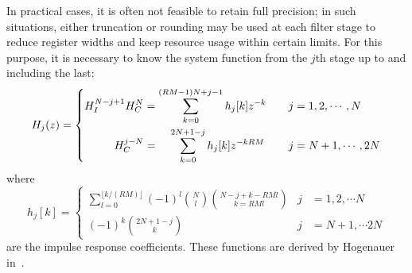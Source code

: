 In practical cases, it is often not feasible to retain full precision; in such
situations, either truncation or rounding may  be used at each filter stage to
reduce register widths and keep resource usage within certain limits. For this
purpose, it is necessary  to know the system function from  the $j$th stage up
to and including the last:
\begin{equation}
    \label{eq:cic:truncation_rounding:system_function}
    H_j(z) = \left\lbrace
        \begin{aligned}
            H_I^{N-j+1}H_C^N                        &
            = \sum_{k=0}^{(RM-1)N+j-1} h_j[k]z^{-k} &
            \quad j                                 &
            = 1, 2, \cdots, N                       \\
            H_C^{j-N}                                          &
            = \hspace{1.1em}\sum_{k=0}^{2N+1-j} h_j[k]z^{-kRM} &
            \quad j                                            &
            = N+1, \cdots, 2N
        \end{aligned}
    \right.
\end{equation}
where
\begin{equation}
    \label{eq:cic:truncation_rounding:system_function}
    h_j[k] = \left\lbrace
        \begin{aligned}
            \sum_{l=0}^{\lfloor k/(RM) \rfloor} (-1)^l
            {{N}\choose{l}}{{N-j+k-RMl}\choose{k = RMl}} &
            j                                            &
            = 1, 2, \cdots N                             \\
            (-1)^k{{2N+1-j}\choose{k}} &
            j                          &
            = N+1, \cdots 2N
        \end{aligned}
    \right.
\end{equation}
are  the  impulse  response   coefficients. These  functions  are  derived  by
Hogenauer in~\cite{1163535}.

